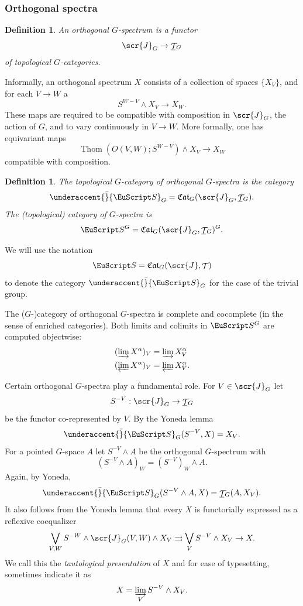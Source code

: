 \documentclass{amsart}
\newtheorem{definition}[equation]{Definition}
\newenvironment{defin}{\begin{definition}\rm}{\end{definition}}
\theoremstyle{definition}
\newtheorem{defin}[equation]{Definition}
\theoremstyle{remark}
\newcommand{\spectra}{\EuScript S}
\DeclareMathOperator{\spaces}{\mathcal T}
\DeclareMathOperator{\thom}{Thom}
\newcommand{\icat}{\scr{J}}
\newcommand{\igcat}[1]{\icat_{#1}}
\newcommand{\gspaces}[1]{\underline{\spaces\mkern-4mu}\mkern4mu_{\!#1}}
\newcommand{\gspectra}[1]{\underaccent{\bar}{\spectra}_{#1}}
\newcommand{\ugspectra}[1]{\spectra^{#1}}
\newcommand{\gcat}[1]{\mathfrak{Cat}_{#1}}
\begin{document}
\subsubsection{Orthogonal spectra}
\label{sec:orthogonal-spectra}

\begin{defin}
\label{def:5}
An {\em orthogonal $G$-spectrum} is a functor 
\[
\igcat G\to \gspaces{G}
\]
of topological $G$-categories.
\end{defin}

Informally, an orthogonal spectrum $X$ consists of a collection of
spaces $\{X_{V} \}$, and for each $V\to W$ a 
\[
S^{W-V}\wedge X_{V}\to X_{W}.
\]
These maps are required to be compatible with composition in $\igcat
G$, the action of $G$, and to vary continuously in $V\to W$.  More
formally, one has equivariant maps
\[
\thom(O(V,W);S^{W-V})\wedge X_{V}\to X_{W}
\]
compatible with composition.

\begin{defin}
\label{def:34} The topological $G$-category of {\em orthogonal
$G$-spectra} is the category
\[
\gspectra G = \gcat G(\igcat G,\gspaces G).
\]
The {\em (topological) category of $G$-spectra} is 
\[
\ugspectra G = \gcat G(\igcat G,\gspaces G)^{G}.
\]
\end{defin}

We will use the notation 
\[
\spectra=\gcat G(\icat,\spaces)
\]
to denote the category $\gspectra{G}$ for the case of the trivial group.


The ($G$-)category of orthogonal $G$-spectra is complete and
cocomplete (in the sense of enriched categories).  Both limits and
colimits in $\ugspectra{G}$ are computed objectwise:
\begin{align*}
(\varinjlim X^{\alpha})_{V} &= \varinjlim X^{\alpha}_{V}\\
(\varprojlim X^{\alpha})_{V} &= \varprojlim X^{\alpha}_{V}.
\end{align*}

Certain orthogonal $G$-spectra play a fundamental role.  For $V\in
\igcat G$ let
\[
S^{-V}:\igcat G\to \gspaces{G}
\]
be the functor co-represented by $V$.  By the Yoneda lemma
\[
\gspectra{G}(S^{-V},X) = X_{V}.
\]
For a pointed $G$-space $A$ let $S^{-V}\wedge A$ be the orthogonal
$G$-spectrum with
\[
\left(S^{-V}\wedge A \right)_{W}= \left(S^{-V} \right)_{W}\wedge A.
\]
Again, by Yoneda,
\[
\gspectra{G}(S^{-V}\wedge A,X) = \gspaces{G}(A, X_{V}).
\]
It also follows from the Yoneda lemma that every $X$ is functorially
expressed as a reflexive coequalizer
\begin{equation}\label{eq:32}
\bigvee_{V,W} S^{-W}\wedge
\igcat G(V,W)\wedge X_{V}\rightrightarrows
\bigvee_{V} S^{-V}\wedge X_{V} \to X.
\end{equation}
We call this the {\em tautological presentation} of $X$ and for ease
of typesetting, sometimes indicate it as
\begin{equation}\label{eq:33}
X=\varinjlim_{V} S^{-V}\wedge X_{V}.
\end{equation}
\end{document}
